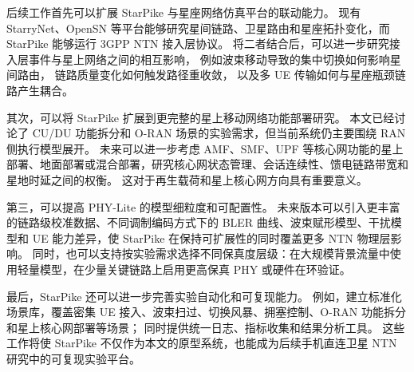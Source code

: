 

后续工作首先可以扩展 StarPike 与星座网络仿真平台的联动能力。
现有 StarryNet、OpenSN 等平台能够研究星间链路、卫星路由和星座拓扑变化，而 StarPike 能够运行 3GPP NTN 接入层协议。
将二者结合后，可以进一步研究接入层事件与星上网络之间的相互影响，
例如波束移动导致的集中切换如何影响星间路由，
链路质量变化如何触发路径重收敛，
以及多 UE 传输如何与星座瓶颈链路产生耦合。

其次，可以将 StarPike 扩展到更完整的星上移动网络功能部署研究。
本文已经讨论了 CU/DU 功能拆分和 O-RAN 场景的实验需求，但当前系统仍主要围绕 RAN 侧执行模型展开。
未来可以进一步考虑 AMF、SMF、UPF 等核心网功能的星上部署、地面部署或混合部署，研究核心网状态管理、会话连续性、馈电链路带宽和星地时延之间的权衡。
这对于再生载荷和星上核心网方向具有重要意义。

第三，可以提高 PHY-Lite 的模型细粒度和可配置性。
未来版本可以引入更丰富的链路级校准数据、不同调制编码方式下的 BLER 曲线、波束赋形模型、干扰模型和 UE 能力差异，使 StarPike 在保持可扩展性的同时覆盖更多 NTN 物理层影响。
同时，也可以支持按实验需求选择不同保真度层级：在大规模背景流量中使用轻量模型，在少量关键链路上启用更高保真 PHY 或硬件在环验证。

最后，StarPike 还可以进一步完善实验自动化和可复现能力。
例如，建立标准化场景库，覆盖密集 UE 接入、波束扫过、切换风暴、拥塞控制、O-RAN 功能拆分和星上核心网部署等场景；
同时提供统一日志、指标收集和结果分析工具。
这些工作将使 StarPike 不仅作为本文的原型系统，也能成为后续手机直连卫星 NTN 研究中的可复现实验平台。

